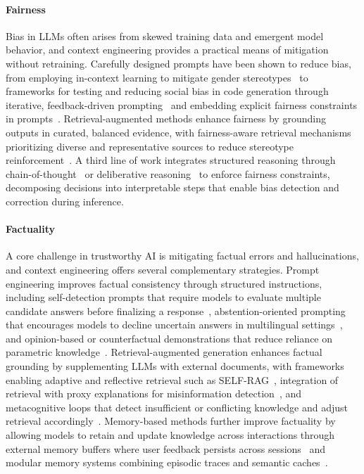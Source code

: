 \paragraph{Fairness}

Bias in LLMs often arises from skewed training data and emergent model behavior, and context engineering provides a practical means of mitigation without retraining. Carefully designed prompts have been shown to reduce bias, from employing in-context learning to mitigate gender stereotypes~\citep{dwivedi2023breaking} to frameworks for testing and reducing social bias in code generation through iterative, feedback-driven prompting~\citep{huang2024bias} and embedding explicit fairness constraints in prompts~\citep{fayyazi2025facter}. Retrieval-augmented methods enhance fairness by grounding outputs in curated, balanced evidence, with fairness-aware retrieval mechanisms prioritizing diverse and representative sources to reduce stereotype reinforcement~\citep{chen2024spica, shrestha2024fairrag}. A third line of work integrates structured reasoning through chain-of-thought~\citep{dhingra2023queer} or deliberative reasoning~\citep{kamruzzaman2024prompting} to enforce fairness constraints, decomposing decisions into interpretable steps that enable bias detection and correction during inference.

\paragraph{Factuality}

A core challenge in trustworthy AI is mitigating factual errors and hallucinations, and context engineering offers several complementary strategies. Prompt engineering improves factual consistency through structured instructions, including self-detection prompts that require models to evaluate multiple candidate answers before finalizing a response~\citep{dhuliawala2024chain, press2023measuring, li2024think}, abstention-oriented prompting that encourages models to decline uncertain answers in multilingual settings~\citep{feng2024teaching}, and opinion-based or counterfactual demonstrations that reduce reliance on parametric knowledge~\citep{zhou2023context}. Retrieval-augmented generation enhances factual grounding by supplementing LLMs with external documents, with frameworks enabling adaptive and reflective retrieval such as SELF-RAG~\citep{asai2024self}, integration of retrieval with proxy explanations for misinformation detection~\citep{wan2024dell, yu2023generate, shi2024replug}, and metacognitive loops that detect insufficient or conflicting knowledge and adjust retrieval accordingly~\citep{zhou2024metacognitive}. Memory-based methods further improve factuality by allowing models to retain and update knowledge across interactions through external memory buffers where user feedback persists across sessions~\citep{chen2024improving} and modular memory systems combining episodic traces and semantic caches~\citep{wang2023augmenting}.
